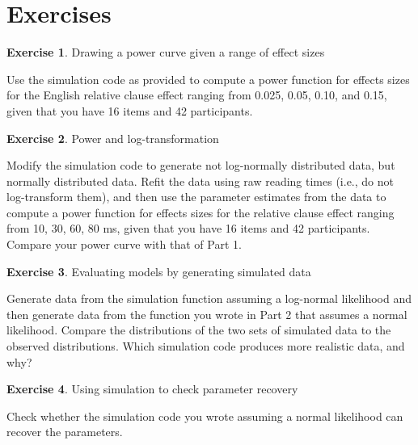 \documentclass[
  12pt,
]{krantz}
\theoremstyle{definition}
\theoremstyle{definition}
\theoremstyle{definition}
\newtheorem{exercise}{Exercise}[chapter]
\theoremstyle{definition}
\theoremstyle{remark}
\begin{document}
\hypertarget{sec:Simulationexercises}{%
\section{Exercises}\label{sec:Simulationexercises}}

\begin{exercise}
\protect\hypertarget{exr:SimulationexercisesPart1}{}\label{exr:SimulationexercisesPart1}Drawing a power curve given a range of effect sizes
\end{exercise}

Use the simulation code as provided to compute a power function for effects sizes for the English relative clause effect ranging from 0.025, 0.05, 0.10, and 0.15, given that you have 16 items and 42 participants.

\begin{exercise}
\protect\hypertarget{exr:SimulationexercisesPart2}{}\label{exr:SimulationexercisesPart2}Power and log-transformation
\end{exercise}

Modify the simulation code to generate not log-normally distributed data, but normally distributed data. Refit the \citet{grodner} data using raw reading times (i.e., do not log-transform them), and then use the parameter estimates from the data to compute a power function for effects sizes for the relative clause effect ranging from 10, 30, 60, 80 ms, given that you have 16 items and 42 participants. Compare your power curve with that of Part 1.

\begin{exercise}
\protect\hypertarget{exr:SimulationexercisesPart3}{}\label{exr:SimulationexercisesPart3}Evaluating models by generating simulated data
\end{exercise}

Generate data from the simulation function assuming a log-normal likelihood and then generate data from the function you wrote in Part 2 that assumes a normal likelihood. Compare the distributions of the two sets of simulated data to the observed distributions. Which simulation code produces more realistic data, and why?

\begin{exercise}
\protect\hypertarget{exr:SimulationexercisesPart4}{}\label{exr:SimulationexercisesPart4}Using simulation to check parameter recovery
\end{exercise}

Check whether the simulation code you wrote assuming a normal likelihood can recover the parameters.
\end{document}
